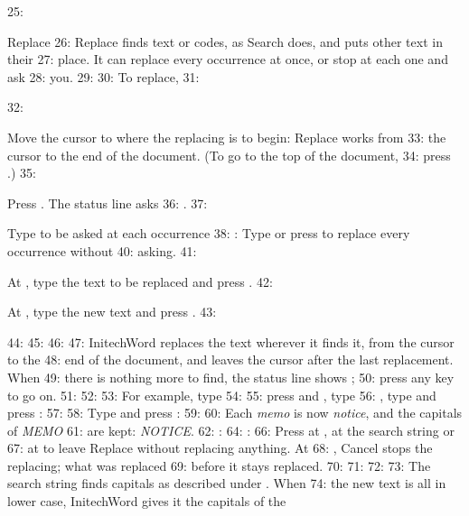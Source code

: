 25: \begin{Feature}{Replace}
26: Replace finds text or codes, as Search does, and puts other text in their
27: place.  It can replace every occurrence at once, or stop at each one and ask
28: you.
29: 
30: To replace,
31: \begin{WPSteps}
32: \item Move the cursor to where the replacing is to begin: Replace works from
33: the cursor to the end of the document.  (To go to the top of the document,
34: press .)
35: \item Press .  The status line asks
36: .
37: \item Type  to be asked at each occurrence
38: : Type  or press  to replace every occurrence without
40: asking.
41: \item At , type the text to be replaced and press .
42: \item At , type the new text and press .
43: \end{WPSteps}
44: 
45: 
46: 
47: InitechWord replaces the text wherever it finds it, from the cursor to the
48: end of the document, and leaves the cursor after the last replacement.  When
49: there is nothing more to find, the status line shows ;
50: press any key to go on.
51: 
52: 
53: For example, type
54: 
55: press  and , type
56: , type  and press :
57: 
58: Type  and press :
59: 
60: Each \textit{memo} is now \textit{notice}, and the capitals of \textit{MEMO}
61: are kept: \textit{NOTICE}.
62: : 
64: : 
66: Press  at , at the search string or
67: at  to leave Replace without replacing anything.  At
68: , Cancel stops the replacing; what was replaced
69: before it stays replaced.
70: 
71: 
72: 
73: The search string finds capitals as described under .  When
74: the new text is all in lower case, InitechWord gives it the capitals of the

\end{Feature}
